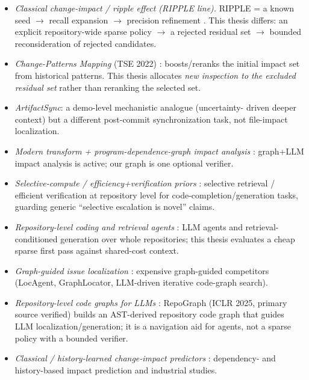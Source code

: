 \documentclass[11pt,a4paper]{article}
\begin{document}
\begin{itemize}
  \item \emph{Classical change-impact / ripple effect (RIPPLE line).}
  RIPPLE = a known seed $\rightarrow$ recall expansion $\rightarrow$ precision
  refinement \cite{haney1972_ripple}. This thesis differs: an explicit
  repository-wide sparse policy $\rightarrow$ a rejected residual set
  $\rightarrow$ bounded reconsideration of rejected candidates.
  \item \emph{Change-Patterns Mapping} (TSE 2022) \cite{huang2022changepatterns}:
  boosts/reranks the initial impact set from historical patterns. This thesis
  allocates \emph{new inspection to the excluded residual set} rather than
  reranking the selected set.
  \item \emph{ArtifactSync}: a demo-level mechanistic analogue (uncertainty-
  driven deeper context) but a different post-commit synchronization task, not
  file-impact localization.
  \item \emph{Modern transform + program-dependence-graph impact analysis}
  \cite{yan2026transformerpdg}: graph+LLM impact analysis is active; our graph
  is one optional verifier.
  \item \emph{Selective-compute / efficiency+verification priors}
  \cite{wu2024repoformer,zhao2025fastcoder}: selective retrieval / efficient
  verification at repository level for code-completion/generation tasks,
  guarding generic ``selective escalation is novel'' claims.
  \item \emph{Repository-level coding and retrieval agents}
  \cite{agentless2024,codeplan2024,repocoder2023,autocoderover2024,repoagent2024}:
  LLM agents and retrieval-conditioned generation over whole repositories;
  this thesis evaluates a cheap sparse first pass against shared-cost context.
  \item \emph{Graph-guided issue localization}
  \cite{locagent2025,graphlocator2026,jiang2025issueloc}: expensive graph-guided
  competitors (LocAgent, GraphLocator, LLM-driven iterative code-graph search).
  \item \emph{Repository-level code graphs for LLMs}
  \cite{repograph2025}: RepoGraph (ICLR 2025, primary source verified) builds an
  AST-derived repository code graph that guides LLM localization/generation; it
  is a navigation aid for agents, not a sparse policy with a bounded verifier.
  \item \emph{Classical / history-learned change-impact predictors}
  \cite{abdeen2015dependency,iwasaki2022impacttool,borg2017recommendationcia,etezadi2025llmcia}:
  dependency- and history-based impact prediction and industrial studies.
\end{itemize}
\end{document}
